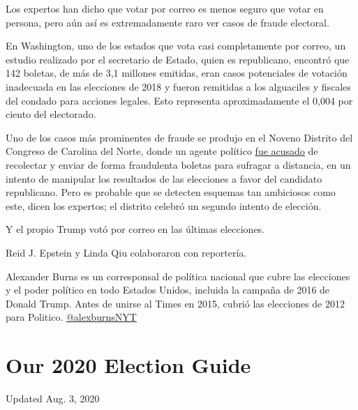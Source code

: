 Los expertos han dicho que votar por correo es menos seguro que votar en
persona, pero aún así es extremadamente raro ver casos de fraude
electoral.

En Washington, uno de los estados que vota casi completamente por
correo, un estudio realizado por el secretario de Estado, quien es
republicano, encontró que 142 boletas, de más de 3,1 millones emitidas,
eran casos potenciales de votación inadecuada en las elecciones de 2018
y fueron remitidas a los alguaciles y fiscales del condado para acciones
legales. Esto representa aproximadamente el 0,004 por ciento del
electorado.

Uno de los casos más prominentes de fraude se produjo en el Noveno
Distrito del Congreso de Carolina del Norte, donde un agente político
\href{https://www.nytimes.com/2019/07/30/us/mccrae-dowless-indictment.html}{fue
acusado} de recolectar y enviar de forma fraudulenta boletas para
sufragar a distancia, en un intento de manipular los resultados de las
elecciones a favor del candidato republicano. Pero es probable que se
detecten esquemas tan ambiciosos como este, dicen los expertos; el
distrito celebró un segundo intento de elección.

Y el propio Trump votó por correo en las últimas elecciones.

Reid J. Epstein y Linda Qiu colaboraron con reportería.

Alexander Burns es un corresponsal de política nacional que cubre las
elecciones y el poder político en todo Estados Unidos, incluida la
campaña de 2016 de Donald Trump. Antes de unirse al Times en 2015,
cubrió las elecciones de 2012 para Politico.
\href{https://twitter.com/alexburnsNYT}{@alexburnsNYT}

\hypertarget{our-2020-election-guide}{%
\section{Our 2020 Election Guide}\label{our-2020-election-guide}}

Updated Aug. 3, 2020

